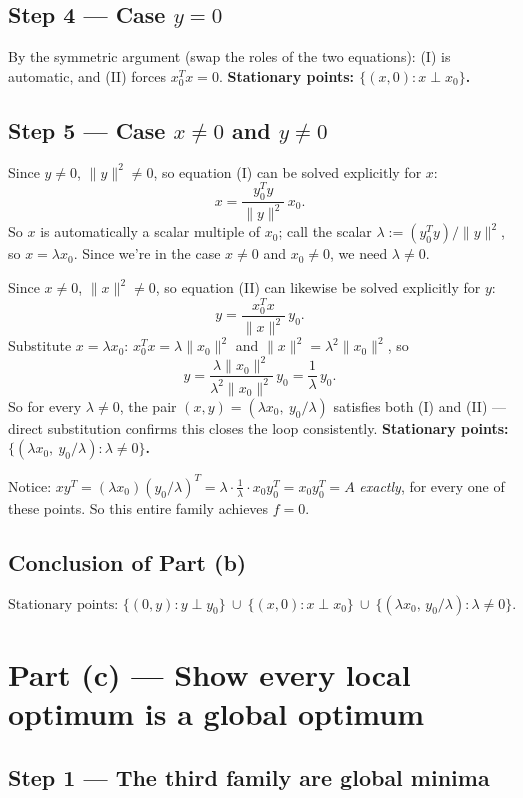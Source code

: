 \documentclass[11pt]{article}
\begin{document}
\subsection*{Step 4 --- Case $y=0$}

By the symmetric argument (swap the roles of the two equations): (I) is automatic, and (II) forces $x_0^Tx=0$. \textbf{Stationary points: $\{(x,0): x\perp x_0\}$.}

\subsection*{Step 5 --- Case $x\ne0$ and $y\ne0$}

Since $y\ne0$, $\|y\|^2\ne0$, so equation (I) can be solved explicitly for $x$:
\[
x = \frac{y_0^Ty}{\|y\|^2}\,x_0.
\]
So $x$ is automatically a scalar multiple of $x_0$; call the scalar $\lambda := (y_0^Ty)/\|y\|^2$, so $x=\lambda x_0$. Since we're in the case $x\ne0$ and $x_0\ne0$, we need $\lambda\ne0$.

Since $x\ne0$, $\|x\|^2\ne0$, so equation (II) can likewise be solved explicitly for $y$:
\[
y = \frac{x_0^Tx}{\|x\|^2}\,y_0.
\]
Substitute $x=\lambda x_0$: $x_0^Tx = \lambda\|x_0\|^2$ and $\|x\|^2=\lambda^2\|x_0\|^2$, so
\[
y = \frac{\lambda\|x_0\|^2}{\lambda^2\|x_0\|^2}\,y_0 = \frac{1}{\lambda}\,y_0.
\]
So for every $\lambda\ne0$, the pair $(x,y) = (\lambda x_0,\ y_0/\lambda)$ satisfies both (I) and (II) --- direct substitution confirms this closes the loop consistently. \textbf{Stationary points: $\{(\lambda x_0,\ y_0/\lambda) : \lambda\ne0\}$.}

Notice: $xy^T = (\lambda x_0)(y_0/\lambda)^T = \lambda\cdot\tfrac1\lambda\cdot x_0y_0^T = x_0y_0^T = A$ \emph{exactly}, for every one of these points. So this entire family achieves $f=0$.

\subsection*{Conclusion of Part (b)}

\[
\boxed{\text{Stationary points: } \{(0,y):y\perp y_0\} \ \cup\ \{(x,0):x\perp x_0\} \ \cup\ \{(\lambda x_0,\,y_0/\lambda):\lambda\ne0\}.}
\]

\section*{Part (c) --- Show every local optimum is a global optimum}

\subsection*{Step 1 --- The third family are global minima}
\end{document}
